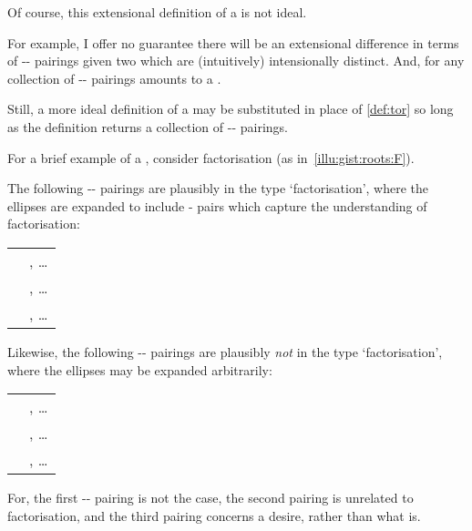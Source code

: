 \begin{note}
  Of course, this extensional definition of a  is not ideal.

  For example, I offer no guarantee there will be an extensional difference in terms of -- pairings given two  which are (intuitively) intensionally distinct.
  And, for any collection of -- pairings amounts to a .

  Still, a more ideal definition of a  may be substituted in place of \autoref{def:tor} so long as the definition returns a collection of -- pairings.
\end{note}


\begin{note}
  For a brief example of a \torN{}, consider factorisation (as in~\autoref{illu:gist:roots:F}).

  The following -\val{}-\pool{} pairings are plausibly in the type `factorisation', where the ellipses are expanded to include - pairs which capture the \agents{} understanding of factorisation:
  \begin{center}
    \begin{tabular}{R{.45\textwidth} L{.45\textwidth}}
       & , \dots \\
       & , \dots \\
       & , \dots \\
    \end{tabular}
  \end{center}
  Likewise, the following -\val{}-\pool{} pairings are plausibly \emph{not} in the type `factorisation', where the ellipses may be expanded arbitrarily:

  \begin{center}
    \begin{tabular}{R{.45\textwidth} L{.45\textwidth}}
       & , \dots \\
       & , \dots \\
       & , \dots \\
    \end{tabular}
  \end{center}

  \noindent%
  For, the first -- pairing is not the case, the second pairing is unrelated to factorisation, and the third pairing concerns a desire, rather than what is.
\end{note}



